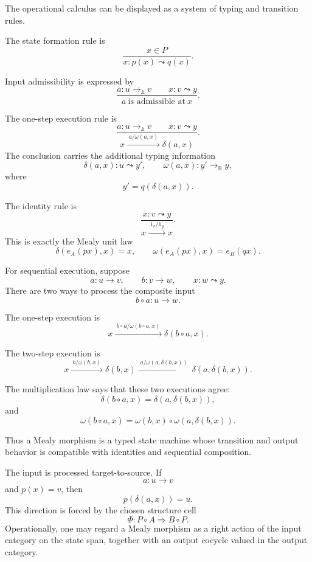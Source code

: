 The operational calculus can be displayed as a system of typing and transition rules.

The state formation rule is
\[
\frac{x\in P}
     {x:p(x)\leadsto q(x)}.
\]

Input admissibility is expressed by
\[
\frac{
a:u\to_{\mathbb A}v
\qquad
x:v\leadsto y
}
{
a\ \text{is admissible at}\ x
}.
\]

The one-step execution rule is
\[
\frac{
a:u\to_{\mathbb A}v
\qquad
x:v\leadsto y
}
{
x
\xrightarrow{\;a/\omega(a,x)\;}
\delta(a,x)
}.
\]
The conclusion carries the additional typing information
\[
\delta(a,x):u\leadsto y',
\qquad
\omega(a,x):y'\to_{\mathbb B}y,
\]
where
\[
y'=q(\delta(a,x)).
\]

The identity rule is
\[
\frac{
x:v\leadsto y
}
{
x\xrightarrow{\;1_v/1_y\;}x
}.
\]
This is exactly the Mealy unit law
\[
\delta(e_A(p x),x)=x,
\qquad
\omega(e_A(p x),x)=e_B(qx).
\]

For sequential execution, suppose
\[
a:u\to v,
\qquad
b:v\to w,
\qquad
x:w\leadsto y.
\]
There are two ways to process the composite input
\[
b\circ a:u\to w.
\]

The one-step execution is
\[
x
\xrightarrow{\;b\circ a/\omega(b\circ a,x)\;}
\delta(b\circ a,x).
\]

The two-step execution is
\[
x
\xrightarrow{\;b/\omega(b,x)\;}
\delta(b,x)
\xrightarrow{\;a/\omega(a,\delta(b,x))\;}
\delta(a,\delta(b,x)).
\]

The multiplication law says that these two executions agree:
\[
\delta(b\circ a,x)
=
\delta(a,\delta(b,x)),
\]
and
\[
\omega(b\circ a,x)
=
\omega(b,x)\circ \omega(a,\delta(b,x)).
\]

Thus a Mealy morphism is a typed state machine whose transition and output behavior is compatible with identities and sequential composition.

\begin{remark}
\label{rem:contravariant-input-processing}
The input is processed target-to-source. If
\[
a:u\to v
\]
and \(p(x)=v\), then
\[
p(\delta(a,x))=u.
\]
This direction is forced by the chosen structure cell
\[
\Phi:P\circ A\Rightarrow B\circ P.
\]
Operationally, one may regard a Mealy morphism as a right action of the input category on the state span, together with an output cocycle valued in the output category.
\end{remark}

